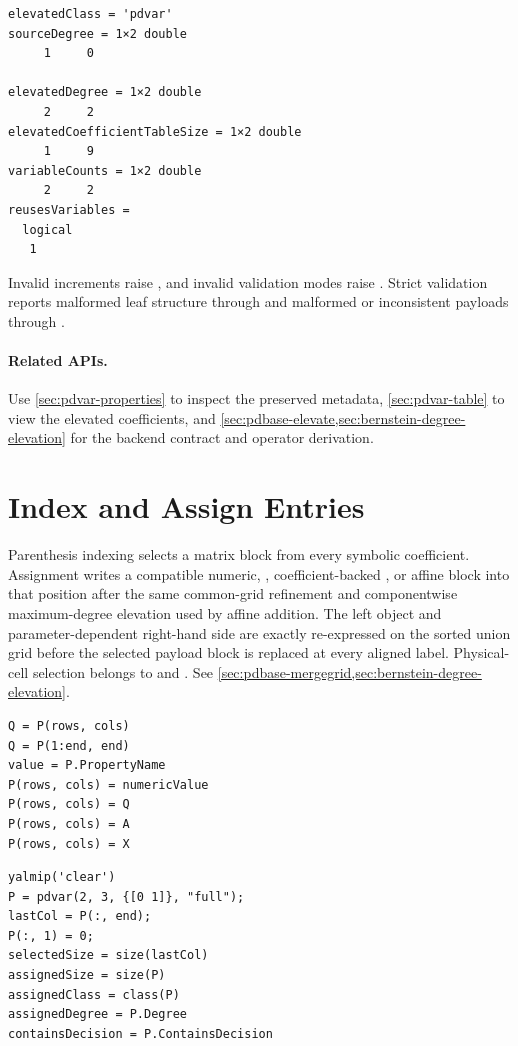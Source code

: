 \begin{lstlisting}[style=dpoutput]
elevatedClass = 'pdvar'
sourceDegree = 1×2 double
     1     0

elevatedDegree = 1×2 double
     2     2
elevatedCoefficientTableSize = 1×2 double
     1     9
variableCounts = 1×2 double
     2     2
reusesVariables =
  logical
   1
\end{lstlisting}

\remarkshead
Invalid increments raise , and invalid validation modes raise . Strict validation reports malformed leaf structure through  and malformed or inconsistent payloads through .

\paragraph{Related APIs.}
Use \cref{sec:pdvar-properties} to inspect the preserved metadata, \cref{sec:pdvar-table} to view the elevated coefficients, and \cref{sec:pdbase-elevate,sec:bernstein-degree-elevation} for the backend contract and operator derivation.

\section{Index and Assign \texorpdfstring{}{pdvar} Entries}
\label{sec:pdvar-indexing}

Parenthesis indexing selects a matrix block from every symbolic coefficient. Assignment writes a compatible numeric, , coefficient-backed , or affine  block into that position after the same common-grid refinement and componentwise maximum-degree elevation used by affine addition. The left object and parameter-dependent right-hand side are exactly re-expressed on the sorted union grid before the selected payload block is replaced at every aligned label. Physical-cell selection belongs to  and . See \cref{sec:pdbase-mergegrid,sec:bernstein-degree-elevation}.

\syntaxhead
\begin{lstlisting}[style=dpsyntax]
Q = P(rows, cols)
Q = P(1:end, end)
value = P.PropertyName
P(rows, cols) = numericValue
P(rows, cols) = Q
P(rows, cols) = A
P(rows, cols) = X
\end{lstlisting}

\examplehead
\begin{lstlisting}[style=dpmatlab]
yalmip('clear')
P = pdvar(2, 3, {[0 1]}, "full");
lastCol = P(:, end);
P(:, 1) = 0;
selectedSize = size(lastCol)
assignedSize = size(P)
assignedClass = class(P)
assignedDegree = P.Degree
containsDecision = P.ContainsDecision
\end{lstlisting}

